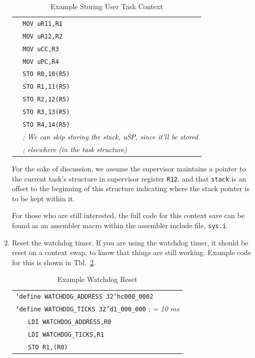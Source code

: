 \documentclass{gqtekspec}
\begin{document}
\begin{enumerate}
\begin{table}
\begin{center}
\begin{tabular}{ll}
&        {\tt MOV uR11,R1} \\
&        {\tt MOV uR12,R2} \\
&        {\tt MOV uCC,R3} \\
&        {\tt MOV uPC,R4} \\
&        {\tt STO R0,10(R5)}\\
&        {\tt STO R1,11(R5)}\\
&        {\tt STO R2,12(R5)}\\
&        {\tt STO R3,13(R5)}\\
&        {\tt STO R4,14(R5)} \\
&	{\em ; We can skip storing the stack, uSP, since it'll be stored}\\
&	{\em ; elsewhere (in the task structure) }\\
\end{tabular}
\caption{Example Storing User Task Context}\label{tbl:context-out}
\end{center}\end{table}
For the sake of discussion, we assume the supervisor maintains a
pointer to the current task's structure in supervisor register
{\tt R12}, and that {\tt stack} is an offset to the beginning of this
structure indicating where the stack pointer is to be kept within it.

	For those who are still interested, the full code for this context
	save can be found as an assembler macro within the assembler
	include file, {\tt sys.i}.

\item Reset the watchdog timer.  If you are using the watchdog timer, it should
	be reset on a context swap, to know that things are still working.
	Example code for this is shown in Tbl.~\ref{tbl:reset-watchdog}.
\begin{table}\begin{center}
\begin{tabular}{ll}
\multicolumn{2}{l}{{\tt `define WATCHDOG\_ADDRESS 32'hc000\_0002}}\\
\multicolumn{2}{l}{{\tt `define WATCHDOG\_TICKS 32'd1\_000\_000} {; \em = 10 ms}}\\
&	{\tt LDI WATCHDOG\_ADDRESS,R0} \\
&	{\tt LDI WATCHDOG\_TICKS,R1} \\
&	{\tt STO R1,(R0)}
\end{tabular}
\caption{Example Watchdog Reset}\label{tbl:reset-watchdog}
\end{center}\end{table}


\end{enumerate}
\end{document}
